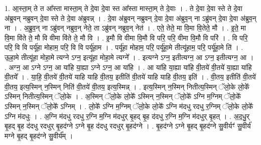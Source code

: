 \documentclass[17pt]{extarticle}
\begin{document}
1. आ॒स्ता॒म् ते त आ᳚स्ता मास्ता॒म् ते दे॒वा दे॒वा स्त आ᳚स्ता मास्ता॒म् ते दे॒वाः । . ते दे॒वा दे॒वा स्ते ते दे॒वा अ॑ब्रुवन् नब्रुवन् दे॒वा स्ते ते दे॒वा अ॑ब्रुवन्न् । . दे॒वा अ॑ब्रुवन् नब्रुवन् दे॒वा दे॒वा अ॑ब्रुव॒न् ना ऽब्रु॑वन् दे॒वा दे॒वा अ॑ब्रुव॒न् ना । . अ॒ब्रु॒व॒न् ना ऽब्रु॑वन् नब्रुव॒न् नेते॒ ता ऽब्रु॑वन् नब्रुव॒न् नेत॑ । . एते॒ तेते॒ मा वि॒मा वि॒तेते॒ मौ । . इ॒ते॒ मा वि॒मा वि॑ते ते॒ मौ वि वीमा वि॑ते ते॒ मौ वि । . इ॒मौ वि वीमा वि॒मौ वि परि॒ परि॒ वीमा वि॒मौ वि परि॑ । . वि परि॒ परि॒ वि वि पर्यू॑हा मोहाम॒ परि॒ वि वि पर्यू॑हाम । . पर्यू॑हा मोहाम॒ परि॒ पर्यू॑हा॒मे तीत्यू॑हाम॒ परि॒ पर्यू॑हा॒मे ति॑ । . ऊ॒हा॒मे तीत्यू॑हा मोहा॒मे त्यग्ने ऽग्न॒ इत्यू॑हा मोहा॒मे त्यग्ने᳚ । . इत्यग्ने ऽग्न॒ इतीत्यग्न॒ आ ऽग्न॒ इतीत्यग्न॒ आ । . अग्न॒ आ ऽग्ने ऽग्न॒ आ या॑हि या॒ह्या ऽग्ने ऽग्न॒ आ या॑हि । . आ या॑हि या॒ह्या या॑हि वी॒तये॑ वी॒तये॑ या॒ह्या या॑हि वी॒तये᳚ । . या॒हि॒ वी॒तये॑ वी॒तये॑ याहि याहि वी॒तय॒ इतीति॑ वी॒तये॑ याहि याहि वी॒तय॒ इति॑ । . वी॒तय॒ इतीति॑ वी॒तये॑ वी॒तय॒ इत्य॒स्मिन् न॒स्मिन् निति॑ वी॒तये॑ वी॒तय॒ इत्य॒स्मिन्न् । . इत्य॒स्मिन् न॒स्मिन् नितीत्य॒स्मिन् ॅलो॒के लो॒के᳚ ऽस्मिन् नितीत्य॒स्मिन् ॅलो॒के । . अ॒स्मिन् ॅलो॒के लो॒के᳚ ऽस्मिन् न॒स्मिन् ॅलो॒के᳚ ऽग्नि म॒ग्निम् ॅलो॒के᳚ ऽस्मिन् न॒स्मिन् ॅलो॒के᳚ ऽग्निम् । . लो॒के᳚ ऽग्नि म॒ग्निम् ॅलो॒के लो॒के᳚ ऽग्नि म॑दधु रदधु र॒ग्निम् ॅलो॒के लो॒के᳚ ऽग्नि म॑दधुः । . अ॒ग्नि म॑दधु रदधु र॒ग्नि म॒ग्नि म॑दधुर् बृ॒हद् बृ॒ह द॑दधु र॒ग्नि म॒ग्नि म॑दधुर् बृ॒हत् । . अ॒द॒धु॒र् बृ॒हद् बृ॒ह द॑दधु रदधुर् बृ॒हद॑ग्ने ऽग्ने बृ॒ह द॑दधु रदधुर् बृ॒हद॑ग्ने । . बृ॒हद॑ग्ने ऽग्ने बृ॒हद् बृ॒हद॑ग्ने सु॒वीर्यꣳ॑ सु॒वीर्य॑ मग्ने बृ॒हद् बृ॒हद॑ग्ने सु॒वीर्य᳚म् । \newline
\end{document}

